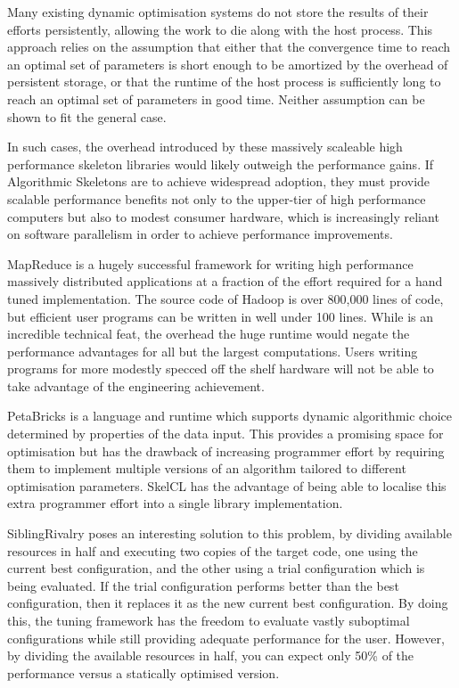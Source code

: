 Many existing dynamic optimisation systems do not store the results of
their efforts persistently, allowing the work to die along with the
host process. This approach relies on the assumption that either that
the convergence time to reach an optimal set of parameters is short
enough to be amortized by the overhead of persistent storage, or that
the runtime of the host process is sufficiently long to reach an
optimal set of parameters in good time. Neither assumption can be
shown to fit the general case.

In such cases, the overhead introduced by these massively scaleable
high performance skeleton libraries would likely outweigh the
performance gains. If Algorithmic Skeletons are to achieve widespread
adoption, they must provide scalable performance benefits not only to
the upper-tier of high performance computers but also to modest
consumer hardware, which is increasingly reliant on software
parallelism in order to achieve performance improvements.

MapReduce is a hugely successful framework for writing high
performance massively distributed applications at a fraction of the
effort required for a hand tuned implementation. The source code of
Hadoop is over 800,000 lines of code, but efficient user programs can
be written in well under 100 lines. While is an incredible technical
feat, the overhead the huge runtime would negate the performance
advantages for all but the largest computations. Users writing
programs for more modestly specced off the shelf hardware will not be
able to take advantage of the engineering achievement.


PetaBricks is a language and runtime which supports dynamic
algorithmic choice determined by properties of the data input. This
provides a promising space for optimisation but has the drawback of
increasing programmer effort by requiring them to implement multiple
versions of an algorithm tailored to different optimisation
parameters. SkelCL has the advantage of being able to localise this
extra programmer effort into a single library implementation.

SiblingRivalry poses an interesting solution to this problem, by
dividing available resources in half and executing two copies of the
target code, one using the current best configuration, and the other
using a trial configuration which is being evaluated. If the trial
configuration performs better than the best configuration, then it
replaces it as the new current best configuration. By doing this, the
tuning framework has the freedom to evaluate vastly suboptimal
configurations while still providing adequate performance for the
user. However, by dividing the available resources in half, you can
expect only 50\% of the performance versus a statically optimised
version.

